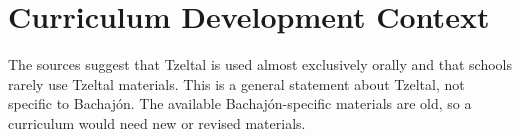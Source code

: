 \documentclass[12pt]{article}
\begin{document}
\section{Curriculum Development Context}
The sources suggest that Tzeltal is used almost exclusively orally and that schools rarely use Tzeltal materials. This is a general statement about Tzeltal, not specific to Bachaj\'on. The available Bachaj\'on-specific materials are old, so a curriculum would need new or revised materials.
\end{document}
